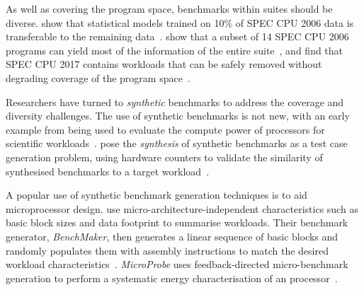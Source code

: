 As well as covering the program space, benchmarks within suites should be diverse.
\citeauthor{Ould-Ahmed-Vall2008} show that statistical models trained on 10\% of SPEC CPU 2006 data is transferable to the remaining data~\cite{Ould-Ahmed-Vall2008}.
\citeauthor{Phansalkar2007} show that a subset of 14 SPEC CPU 2006 programs can yield most of the information of the entire suite~\cite{Phansalkar2007}, and
\citeauthor{Draft2018} find that SPEC CPU 2017 contains workloads that can be safely removed without degrading coverage of the program space~\cite{Draft2018}.

Researchers have turned to \emph{synthetic} benchmarks to address the coverage and diversity challenges.
The use of synthetic benchmarks is not new, with an early example from \citeyear{Curnow1976} being used to evaluate the compute power of processors for scientific workloads~\cite{Curnow1976}.
\citeauthor{Bell2005} pose the \emph{synthesis} of synthetic benchmarks as a test case generation problem, using hardware counters to validate the similarity of synthesised benchmarks to a target workload~\cite{Bell2005}.

A popular use of synthetic benchmark generation techniques is to aid microprocessor design. \citeauthor{Joshi2008} use micro-architecture-independent characteristics such as basic block sizes and data footprint to summarise workloads. Their benchmark generator, \emph{BenchMaker}, then generates a linear sequence of basic blocks and randomly populates them with assembly instructions to match the desired workload characteristics~\cite{Joshi2008}.
\emph{MicroProbe} uses feedback-directed micro-benchmark generation to perform a systematic energy characterisation of an processor~\cite{Bertran2012}.

